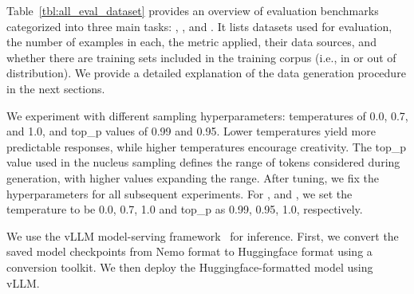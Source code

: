  Table~\ref{tbl:all_eval_dataset} provides an overview of evaluation benchmarks categorized into three main tasks: \mmlu, \datadiscovery, and \texttosql. It lists datasets used for evaluation, the number of examples in each, the metric applied, their data sources, and whether there are training sets included in the training corpus (i.e., in or out of distribution). We provide a detailed explanation of the data generation procedure in the next sections.


  We experiment with different sampling hyperparameters: temperatures of 0.0, 0.7, and 1.0, and top\_p values of 0.99 and 0.95. Lower temperatures yield more predictable responses, while higher temperatures encourage creativity. The top\_p value used in the nucleus sampling defines the range of tokens considered during generation, with higher values expanding the range. After tuning, we fix the hyperparameters for all subsequent experiments. For \mmlu, \datadiscovery and \texttosql, we set the temperature to be 0.0, 0.7, 1.0 and top\_p as 0.99, 0.95, 1.0, respectively.

 We use the vLLM model-serving framework~\citep{vllm} for inference. First, we convert the saved model checkpoints from Nemo format to Huggingface format using a conversion toolkit. We then deploy the Huggingface-formatted model using vLLM.


